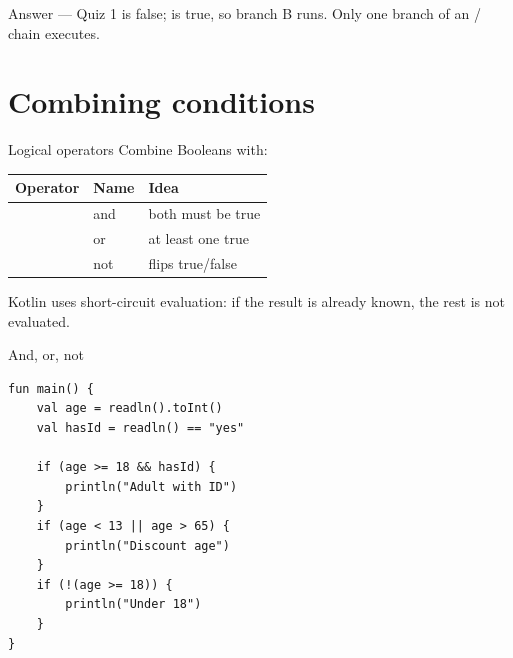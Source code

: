 \documentclass[aspectratio=169,11pt]{beamer}
\begin{document}
    \begin{frame}{Answer --- Quiz 1}
        \vspace{0.4em}
         is false;  is true, so branch B runs.
        Only one branch of an / chain executes.
    \end{frame}

    \section{Combining conditions}

    \begin{frame}{Logical operators}
        Combine Booleans with:
        \vspace{0.5em}
        \begin{tabular}{lll}
            \toprule
            Operator & Name & Idea \\
            \midrule
            \kotlincode{\&\&} & and & both must be true \\
            \kotlincode{||} & or & at least one true \\
            \kotlincode{!} & not & flips true/false \\
            \bottomrule
        \end{tabular}
        \vspace{0.6em}
        Kotlin uses short-circuit evaluation: if the result is already known,
        the rest is not evaluated.
    \end{frame}

    \begin{frame}[fragile]{And, or, not}
        \begin{lstlisting}
fun main() {
    val age = readln().toInt()
    val hasId = readln() == "yes"

    if (age >= 18 && hasId) {
        println("Adult with ID")
    }
    if (age < 13 || age > 65) {
        println("Discount age")
    }
    if (!(age >= 18)) {
        println("Under 18")
    }
}
        \end{lstlisting}
    \end{frame}
\end{document}
